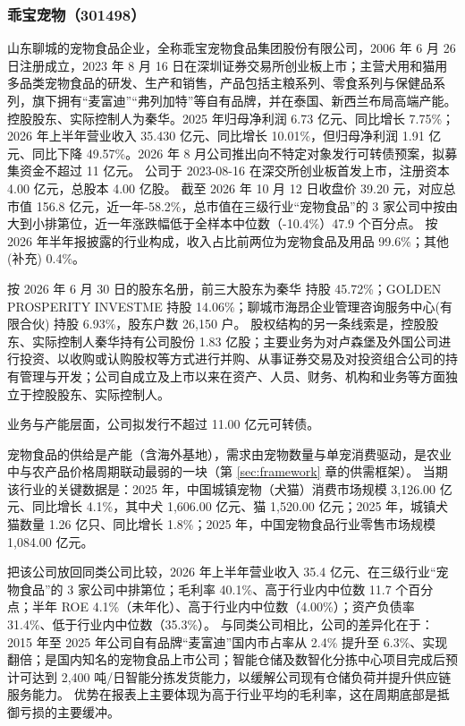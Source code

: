 
\subsubsection{乖宝宠物（301498）}
\label{co:301498}

 山东聊城的宠物食品企业，全称乖宝宠物食品集团股份有限公司，2006 年 6 月 26 日注册成立，2023 年 8 月 16 日在深圳证券交易所创业板上市；主营犬用和猫用多品类宠物食品的研发、生产和销售，产品包括主粮系列、零食系列与保健品系列，旗下拥有“麦富迪”“弗列加特”等自有品牌，并在泰国、新西兰布局高端产能。控股股东、实际控制人为秦华。2025 年归母净利润 6.73 亿元、同比增长 7.75\%；2026 年上半年营业收入 35.430 亿元、同比增长 10.01\%，但归母净利润 1.91 亿元、同比下降 49.57\%。2026 年 8 月公司推出向不特定对象发行可转债预案，拟募集资金不超过 11 亿元。 公司于 2023-08-16 在深交所创业板首发上市，注册资本 4.00 亿元，总股本 4.00 亿股。 截至 2026 年 10 月 12 日收盘价 39.20 元，对应总市值 156.8 亿元，近一年-58.2\%，总市值在三级行业“宠物食品”的 3 家公司中按由大到小排第位，近一年涨跌幅低于全样本中位数（-10.4\%）47.9 个百分点。 按 2026 年半年报披露的行业构成，收入占比前两位为宠物食品及用品 99.6\%；其他(补充) 0.4\%。

 按 2026 年 6 月 30 日的股东名册，前三大股东为秦华 持股 45.72\%；GOLDEN PROSPERITY INVESTME 持股 14.06\%；聊城市海昂企业管理咨询服务中心(有限合伙) 持股 6.93\%，股东户数 26,150 户。 股权结构的另一条线索是，控股股东、实际控制人秦华持有公司股份 1.83 亿股；主要业务为对卢森堡及外国公司进行投资、以收购或认购股权等方式进行并购、从事证券交易及对投资组合公司的持有管理与开发；公司自成立及上市以来在资产、人员、财务、机构和业务等方面独立于控股股东、实际控制人。

 业务与产能层面，公司拟发行不超过 11.00 亿元可转债。

 宠物食品的供给是产能（含海外基地），需求由宠物数量与单宠消费驱动，是农业中与农产品价格周期联动最弱的一块（第 \ref{sec:framework} 章的供需框架）。 当期该行业的关键数据是：2025 年，中国城镇宠物（犬猫）消费市场规模 3,126.00 亿元、同比增长 4.1\%，其中犬 1,606.00 亿元、猫 1,520.00 亿元；2025 年，城镇犬猫数量 1.26 亿只、同比增长 1.8\%；2025 年，中国宠物食品行业零售市场规模 1,084.00 亿元。

 把该公司放回同类公司比较，2026 年上半年营业收入 35.4 亿元、在三级行业“宠物食品”的 3 家公司中排第位；毛利率 40.1\%、高于行业内中位数 11.7 个百分点；半年 ROE 4.1\%（未年化）、高于行业内中位数（4.00\%）；资产负债率 31.4\%、低于行业内中位数（35.3\%）。 与同类公司相比，公司的差异化在于：2015 年至 2025 年公司自有品牌“麦富迪”国内市占率从 2.4\% 提升至 6.3\%、实现翻倍；是国内知名的宠物食品上市公司；智能仓储及数智化分拣中心项目完成后预计可达到 2,400 吨/日智能分拣发货能力，以缓解公司现有仓储负荷并提升供应链服务能力。 优势在报表上主要体现为高于行业平均的毛利率，这在周期底部是抵御亏损的主要缓冲。

